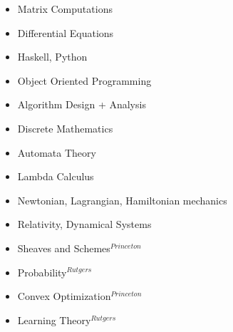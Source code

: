 \begin{multicols}{3}
\begin{itemize}
\setlength\itemsep{-0.5em}
\item Matrix Computations
\item Differential Equations
\item Haskell, Python
\item Object Oriented Programming
\item Algorithm Design + Analysis
\item Discrete Mathematics
\item Automata Theory
\item Lambda Calculus
\item Newtonian, Lagrangian, Hamiltonian mechanics
\item Relativity, Dynamical Systems
\item Sheaves and Schemes$^{Princeton}$
\item Probability$^{Rutgers}$
\item Convex Optimization$^{Princeton}$
\item Learning Theory$^{Rutgers}$
\end{itemize}
\end{multicols}


\vspace{-5pt}



